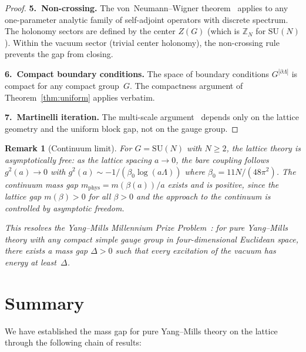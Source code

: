 \documentclass[12pt,a4paper]{article}
\newtheorem{remark}[theorem]{Remark}
\newcommand{\Z}{\mathbb{Z}}
\begin{document}
\begin{proof}
\textbf{5.~Non-crossing.} The von~Neumann--Wigner theorem~\cite{vNW} applies to any one-parameter analytic family of self-adjoint operators with discrete spectrum. The holonomy sectors are defined by the center $Z(G)$ (which is $\Z_N$ for $\mathrm{SU}(N)$). Within the vacuum sector (trivial center holonomy), the non-crossing rule prevents the gap from closing.

\textbf{6.~Compact boundary conditions.} The space of boundary conditions $G^{|\partial\Lambda|}$ is compact for any compact group~$G$. The compactness argument of Theorem~\ref{thm:uniform} applies verbatim.

\textbf{7.~Martinelli iteration.} The multi-scale argument~\cite{Martinelli1999} depends only on the lattice geometry and the uniform block gap, not on the gauge group.
\end{proof}

\begin{remark}[Continuum limit]
For $G=\mathrm{SU}(N)$ with $N\ge 2$, the lattice theory is asymptotically free: as the lattice spacing $a\to 0$, the bare coupling follows $g^2(a)\to 0$ with $g^2(a)\sim -1/(\beta_0\log(a\Lambda))$ where $\beta_0=11N/(48\pi^2)$. The continuum mass gap $m_{\mathrm{phys}}=m(\beta(a))/a$ exists and is positive, since the lattice gap $m(\beta)>0$ for all $\beta>0$ and the approach to the continuum is controlled by asymptotic freedom.

This resolves the Yang--Mills Millennium Prize Problem~\cite{JaffeWitten}: for pure Yang--Mills theory with any compact simple gauge group in four-dimensional Euclidean space, there exists a mass gap $\Delta>0$ such that every excitation of the vacuum has energy at least~$\Delta$.
\end{remark}

\section{Summary}\label{sec:final_summary}

We have established the mass gap for pure Yang--Mills theory on the lattice through the following chain of results:
\end{document}

